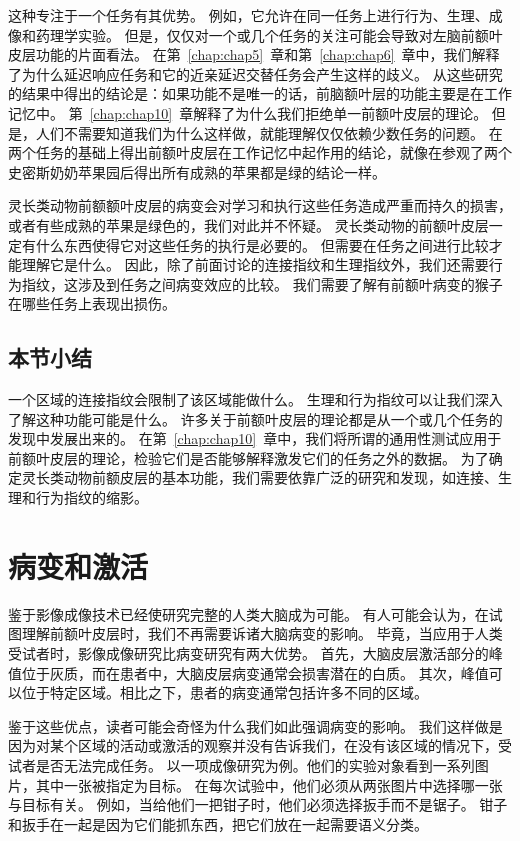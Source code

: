 \par
这种专注于一个任务有其优势。
例如，它允许在同一任务上进行行为、生理、成像和药理学实验。
但是，仅仅对一个或几个任务的关注可能会导致对左脑前额叶皮层功能的片面看法。
在第~\ref{chap:chap5}~章和第~\ref{chap:chap6}~章中，我们解释了为什么延迟响应任务和它的近亲延迟交替任务会产生这样的歧义。
从这些研究的结果中得出的结论是：如果功能不是唯一的话，前脑额叶层的功能主要是在工作记忆中。
第~\ref{chap:chap10}~章解释了为什么我们拒绝单一前额叶皮层的理论。
但是，人们不需要知道我们为什么这样做，就能理解仅仅依赖少数任务的问题。
在两个任务的基础上得出前额叶皮层在工作记忆中起作用的结论，就像在参观了两个史密斯奶奶苹果园后得出所有成熟的苹果都是绿的结论一样。
\par
灵长类动物前额额叶皮层的病变会对学习和执行这些任务造成严重而持久的损害，或者有些成熟的苹果是绿色的，我们对此并不怀疑。
灵长类动物的前额叶皮层一定有什么东西使得它对这些任务的执行是必要的。
但需要在任务之间进行比较才能理解它是什么。
因此，除了前面讨论的连接指纹和生理指纹外，我们还需要行为指纹，这涉及到任务之间病变效应的比较。
我们需要了解有前额叶病变的猴子在哪些任务上表现出损伤。


\subsection{本节小结}

一个区域的连接指纹会限制了该区域能做什么。
生理和行为指纹可以让我们深入了解这种功能可能是什么。
许多关于前额叶皮层的理论都是从一个或几个任务的发现中发展出来的。
在第~\ref{chap:chap10}~章中，我们将所谓的通用性测试应用于前额叶皮层的理论，检验它们是否能够解释激发它们的任务之外的数据。
为了确定灵长类动物前额皮层的基本功能，我们需要依靠广泛的研究和发现，如连接、生理和行为指纹的缩影。


\section{病变和激活}

鉴于影像成像技术已经使研究完整的人类大脑成为可能。
有人可能会认为，在试图理解前额叶皮层时，我们不再需要诉诸大脑病变的影响。
毕竟，当应用于人类受试者时，影像成像研究比病变研究有两大优势。
首先，大脑皮层激活部分的峰值位于灰质，而在患者中，大脑皮层病变通常会损害潜在的白质。
其次，峰值可以位于特定区域。相比之下，患者的病变通常包括许多不同的区域。


\par
鉴于这些优点，读者可能会奇怪为什么我们如此强调病变的影响。
我们这样做是因为对某个区域的活动或激活的观察并没有告诉我们，在没有该区域的情况下，受试者是否无法完成任务。
以一项成像研究为例\cite{price1999delineating}。他们的实验对象看到一系列图片，其中一张被指定为目标。
在每次试验中，他们必须从两张图片中选择哪一张与目标有关。
例如，当给他们一把钳子时，他们必须选择扳手而不是锯子。
钳子和扳手在一起是因为它们能抓东西，把它们放在一起需要语义分类。


